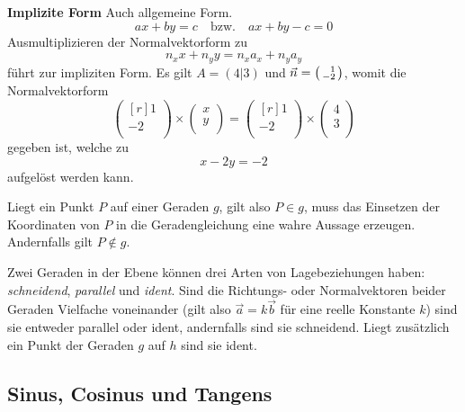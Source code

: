 \documentclass[twocolumn]{article}
\newcommand{\term}[1]{\emph{#1}}
\newcommand{\separator}{\vspace{0.5em}}
\newcommand{\topic}[1]{\noindent\textbf{#1}}
\begin{document}
\separator\topic{Implizite Form} Auch allgemeine Form.
\begin{equation*}
    ax + by = c\quad \mathrm{bzw.}\quad ax + by - c = 0
\end{equation*}
Ausmultiplizieren der Normalvektorform zu
\begin{equation*}
    n_{x}x + n_{y}y = n_{x}a_{x} + n_{y}a_{y}
\end{equation*}
führt zur impliziten Form. Es gilt $A=(4|3)$ und $\Vec{n} = \begin{psmallmatrix*}[r]1 \\ -2 \\ \end{psmallmatrix*}$, womit die Normalvektorform
\begin{equation*}
    \begin{pmatrix*}[r]1 \\ -2 \\\end{pmatrix*} \times \begin{pmatrix}x \\ y \\\end{pmatrix} = \begin{pmatrix*}[r]1 \\ -2 \\\end{pmatrix*} \times \begin{pmatrix}4 \\ 3 \\\end{pmatrix}
\end{equation*}
gegeben ist, welche zu
\begin{equation*}
    x - 2y = -2
\end{equation*}
aufgelöst werden kann.
\separator

Liegt ein Punkt $P$ auf einer Geraden $g$, gilt also $P \in g$, muss das Einsetzen der Koordinaten von $P$ in die Geradengleichung eine wahre Aussage erzeugen. Andernfalls gilt $P \not\in g$.
\separator

Zwei Geraden in der Ebene können drei Arten von Lagebeziehungen haben: \term{schneidend}, \term{parallel} und \term{ident}. Sind die Richtungs- oder Normalvektoren beider Geraden Vielfache voneinander (gilt also $\Vec{a} = k\Vec{b}$ für eine reelle Konstante $k$) sind sie entweder parallel oder ident, andernfalls sind sie schneidend. Liegt zusätzlich ein Punkt der Geraden $g$ auf $h$ sind sie ident.

\subsection{Sinus, Cosinus und Tangens}
\end{document}
